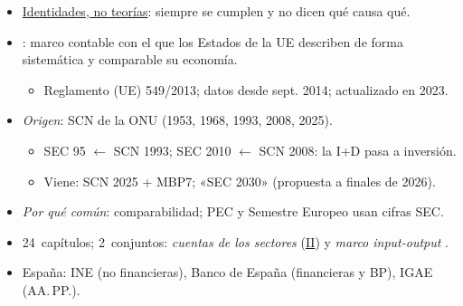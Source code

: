 \documentclass{article}
\begin{document}
\begin{columnas}
\begin{itemize}
  \begin{itemize}
  \item \uline{Identidades, no teorías}: siempre se cumplen y no dicen qué causa qué.
  \end{itemize}
\end{itemize}
\begin{itemize}
\item {}: marco contable con el que los Estados de la UE describen de forma sistemática y comparable su economía.
  \begin{itemize}
  \item Reglamento (UE) 549/2013; datos desde sept. 2014; actualizado en 2023.
  \end{itemize}
\item \emph{Origen}: SCN de la ONU (1953, 1968, 1993, 2008, 2025).
  \begin{itemize}
  \item SEC 95 $\leftarrow$ SCN 1993; SEC 2010 $\leftarrow$ SCN 2008: la I+D pasa a inversión.
  \item Viene: SCN 2025 + MBP7; «SEC 2030» (propuesta a finales de 2026).
  \end{itemize}
\item \emph{Por qué común}: comparabilidad; PEC y Semestre Europeo usan cifras SEC.
\end{itemize}
\begin{itemize}
\item 24~capítulos; 2~conjuntos: \emph{cuentas de los sectores} (\hyperref[rep:II]{II}) y \emph{marco input-output} .
\item España: INE (no financieras), Banco de España (financieras y BP), IGAE (AA.\,PP.).
\end{itemize}


\end{columnas}
\end{document}
